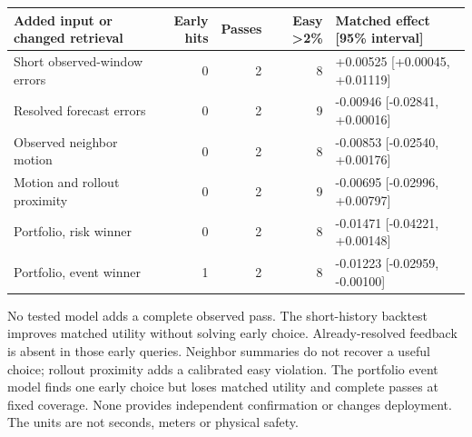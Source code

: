 \documentclass[10pt,onecolumn,letterpaper]{article}
\begin{document}
\begin{center}\small
{}
\setlength{\tabcolsep}{4pt}
\begin{tabularx}{\textwidth}{Xrrrl}\toprule
\textbf{Added input or changed retrieval} & \textbf{Early hits} & \textbf{Passes} & \textbf{Easy >2\%} & \textbf{Matched effect [95\% interval]} \\\midrule
Short observed-window errors & 0 & 2 & 8 & +0.00525 [+0.00045, +0.01119] \\
Resolved forecast errors & 0 & 2 & 9 & -0.00946 [-0.02841, +0.00016] \\
Observed neighbor motion & 0 & 2 & 8 & -0.00853 [-0.02540, +0.00176] \\
Motion and rollout proximity & 0 & 2 & 9 & -0.00695 [-0.02996, +0.00797] \\
Portfolio, risk winner & 0 & 2 & 8 & -0.01471 [-0.04221, +0.00148] \\
Portfolio, event winner & 1 & 2 & 8 & -0.01223 [-0.02959, -0.00100] \\
\bottomrule\end{tabularx}
\end{center}

No tested model adds a complete observed pass. The short-history backtest improves matched utility without solving early choice. Already-resolved feedback is absent in those early queries. Neighbor summaries do not recover a useful choice; rollout proximity adds a calibrated easy violation. The portfolio event model finds one early choice but loses matched utility and complete passes at fixed coverage. None provides independent confirmation or changes deployment. The units are not seconds, meters or physical safety.
\end{document}
